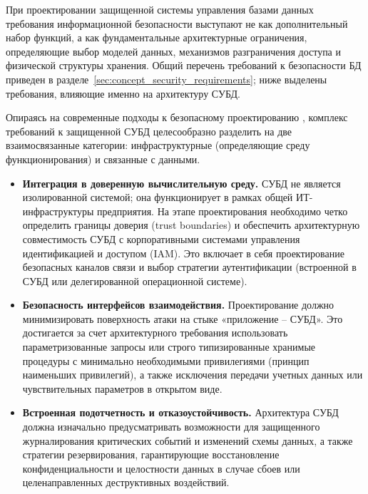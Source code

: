 При проектировании защищенной системы управления базами данных требования информационной безопасности выступают не как дополнительный набор функций, а как фундаментальные архитектурные ограничения, определяющие выбор моделей данных, механизмов разграничения доступа и физической структуры хранения. Общий перечень требований к безопасности БД приведен в разделе~\ref{sec:concept_security_requirements}; ниже выделены требования, влияющие именно на архитектуру СУБД.

Опираясь на современные подходы к безопасному проектированию \autocite{LAPA}, комплекс требований к защищенной СУБД целесообразно разделить на две взаимосвязанные категории: инфраструктурные (определяющие среду функционирования) и связанные с данными.

\begin{itemize}
    \item \textbf{Интеграция в доверенную вычислительную среду.} 
    СУБД не является изолированной системой; она функционирует в рамках общей ИТ-инфраструктуры предприятия. На этапе проектирования необходимо четко определить границы доверия (trust boundaries) и обеспечить архитектурную совместимость СУБД с корпоративными системами управления идентификацией и доступом (IAM). Это включает в себя проектирование безопасных каналов связи и выбор стратегии аутентификации (встроенной в СУБД или делегированной операционной системе). \cite{nist800160}

    \item \textbf{Безопасность интерфейсов взаимодействия.} 
    Проектирование должно минимизировать поверхность атаки на стыке «приложение – СУБД». Это достигается за счет архитектурного требования использовать параметризованные запросы или строго типизированные хранимые процедуры с минимально необходимыми привилегиями (принцип наименьших привилегий), а также исключения передачи учетных данных или чувствительных параметров в открытом виде.

    \item \textbf{Встроенная подотчетность и отказоустойчивость.} 
    Архитектура СУБД должна изначально предусматривать возможности для защищенного журналирования критических событий и изменений схемы данных, а также стратегии резервирования, гарантирующие восстановление конфиденциальности и целостности данных в случае сбоев или целенаправленных деструктивных воздействий. \cite{nist80053}
\end{itemize}

